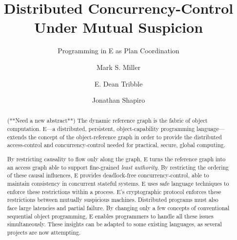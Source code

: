 \documentclass{llncs}
\begin{document}
% 

\newcommand{\name}[1]{{\sf\textsl{#1}}}        %
\newcommand{\vat}[1]{{\sf Vat{#1}}}            %
\newcommand{\pr}[1]{{#1}}                      %
\newcommand{\code}[1]{{\tt {#1}}}              %
\newcommand{\var}[1]{{\tt {#1}}}               %
\newcommand{\dvar}[1]{{\textsl{#1}}}           %
\newcommand{\dobj}[1]{{\textsl{#1}}}           %
\newcommand{\meth}[1]{{\tt {#1}}}              %
\newcommand{\dmeth}[1]{{\tt {#1}}}             %
\newcommand{\cls}[1]{{\tt {#1}}}               %
\newcommand{\ex}[1]{{\tt {#1}}}                %
\newcommand{\abst}[1]{{#1}}                    %
\newcommand{\sys}[1]{{\sc {#1}}}               %


\title{Distributed Concurrency-Control Under Mutual Suspicion}
\subtitle{Programming in E as Plan Coordination}

\author{Mark S. Miller \and 
  E. Dean Tribble \and
  Jonathan Shapiro}


\maketitle

\begin{abstract}
(**Need a new abstract**)
The dynamic reference graph is the fabric of object computation. E---a
distributed, persistent, object-capability programming
language---extends the concept of the object-reference graph in order
to provide the distributed access-control and concurrency-control
needed for practical, secure, global computing.

By restricting causality to flow only along the graph, E turns the
reference graph into an access graph able to support fine-grained
\emph{least authority}. By restricting the ordering of these causal
influences, E provides deadlock-free concurrency-control, able to
maintain consistency in concurrent stateful systems.  E uses safe
language techniques to enforce these restrictions within a
process. E's cryptographic protocol enforces these restrictions
between mutually suspicious machines. Distributed programs must also
face large latencies and partial failure. By changing only a few
concepts of conventional sequential object programming, E enables
programmers to handle all these issues simultaneously. These insights
can be adapted to some existing languages, as several projects are now
attempting.
\end{abstract}
\end{document}
